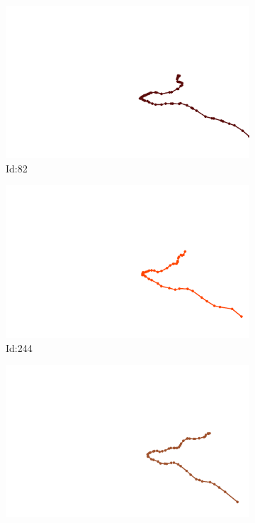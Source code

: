 \documentclass[12pt,twoside]{report}
\begin{document}
\begin{figure}
\centering
\begin{subfigure}[b]{0.20\textwidth}
\centering
\includegraphics[width=\textwidth]{../../trajectories/82.png}
\caption{Id:82}
\end{subfigure}
\begin{subfigure}[b]{0.20\textwidth}
\centering
\includegraphics[width=\textwidth]{../../trajectories/244.png}
\caption{Id:244}
\end{subfigure}
\begin{subfigure}[b]{0.20\textwidth}
\centering
\includegraphics[width=\textwidth]{../../trajectories/303.png}

\end{subfigure}
\end{figure}
\end{document}
